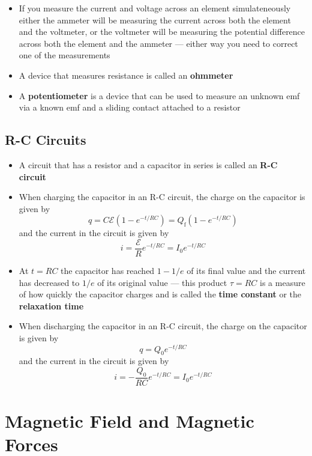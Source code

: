 \documentclass{article}
\begin{document}
\begin{itemize}
  \item If you measure the current and voltage across an element simulateneously either the ammeter will be measuring the current across both the element and the voltmeter, or the voltmeter will be measuring the potential difference across both the element and the ammeter — either way you need to correct one of the measurements

  \item A device that measures resistance is called an \textbf{ohmmeter}

  \item A \textbf{potentiometer} is a device that can be used to measure an unknown emf via a known emf and a sliding contact attached to a resistor
\end{itemize}

\subsection{R-C Circuits}

\begin{itemize}
  \item A circuit that has a resistor and a capacitor in series is called an \textbf{R-C circuit}

  \item When charging the capacitor in an R-C circuit, the charge on the capacitor is given by \[q = C \mathcal{E} (1 - e^{-t / R C}) = Q_\textrm{f} (1 - e^{-t / R C})\] and the current in the circuit is given by \[i = \frac{\mathcal{E}}{R} e^{-t / R C} = I_0 e^{-t / R C}\]

  \item At $t = R C$ the capacitor has reached $1 - 1 / e$ of its final value and the current has decreased to $1 / e$ of its original value — this product $\tau = R C$ is a measure of how quickly the capacitor charges and is called the \textbf{time constant} or the \textbf{relaxation time}

  \item When discharging the capacitor in an R-C circuit, the charge on the capacitor is given by \[q = Q_0 e^{-t / R C}\] and the current in the circuit is given by \[i = -\frac{Q_0}{R C} e^{-t / R C} = I_0 e^{-t / R C}\]
\end{itemize}

\section{Magnetic Field and Magnetic Forces}
\end{document}
